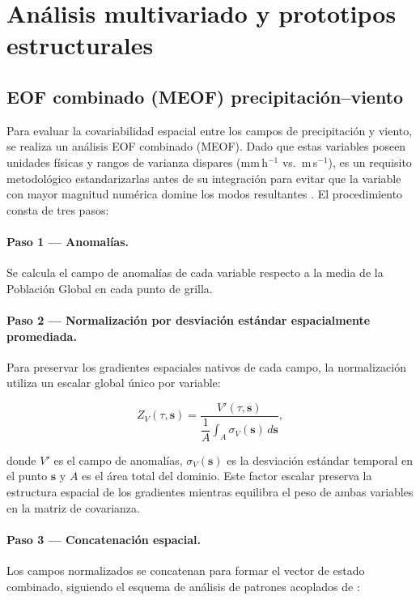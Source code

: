 \section{Análisis multivariado y prototipos estructurales}\label{sec:meof_prototipos}
 
\subsection{EOF combinado (MEOF) precipitación--viento}\label{subsec:eof_multivariado}
 
Para evaluar la covariabilidad espacial entre los campos de precipitación y viento, se realiza un análisis EOF combinado (MEOF). Dado que estas variables poseen unidades físicas y rangos de varianza dispares (mm\,h$^{-1}$ vs.\ m\,s$^{-1}$), es un requisito metodológico estandarizarlas antes de su integración para evitar que la variable con mayor magnitud numérica domine los modos resultantes \citep{wilks2019statistical_ch13}. El procedimiento consta de tres pasos:
 
\paragraph{Paso 1 — Anomalías.} Se calcula el campo de anomalías de cada variable respecto a la media de la Población Global en cada punto de grilla.
 
\paragraph{Paso 2 — Normalización por desviación estándar espacialmente promediada.} Para preservar los gradientes espaciales nativos de cada campo, la normalización utiliza un escalar global único por variable:
 
\begin{equation}
    Z_{V}(\tau, \mathbf{s}) = \frac{V'(\tau, \mathbf{s})}{\dfrac{1}{A}\displaystyle\int_{A} \sigma_{V}(\mathbf{s})\, d\mathbf{s}},
\end{equation}
 
donde $V'$ es el campo de anomalías, $\sigma_{V}(\mathbf{s})$ es la desviación estándar temporal en el punto $\mathbf{s}$ y $A$ es el área total del dominio. Este factor escalar preserva la estructura espacial de los gradientes mientras equilibra el peso de ambas variables en la matriz de covarianza.
 
\paragraph{Paso 3 — Concatenación espacial.} Los campos normalizados se concatenan para formar el vector de estado combinado, siguiendo el esquema de análisis de patrones acoplados de \citet{bretherton1992intercomparison}:
 
